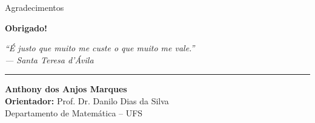 \documentclass[aspectratio=169]{beamer}
\begin{document}
\begin{frame}{Agradecimentos}
  \centering
  \begin{center}
    {\Huge \textbf{Obrigado!}}
  \end{center}
  \vfill
  \begin{block}{}
    \centering
    \vspace{0.2cm}
    \large \itshape ``É justo que muito me custe o que muito me vale.'' \\[0.3cm]
    \small \upshape --- Santa Teresa d'Ávila
    \vspace{0.2cm}
  \end{block}

  \vfill
  {\centering \rule{0.5\textwidth}{0.4pt}\par} %
  \vfill

  \begin{center}
    \small
    \textbf{Anthony dos Anjos Marques} \\
    \textbf{Orientador:} Prof. Dr. Danilo Dias da Silva \\
    \footnotesize Departamento de Matemática -- UFS
  \end{center}
\end{frame}
\end{document}
